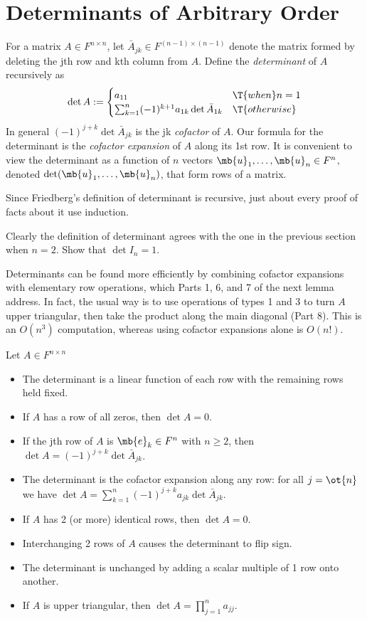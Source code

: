 \section{Determinants of Arbitrary Order}
\begin{defn}%
For a matrix $A \in F^{n \times n}$, let $\bar{A}_{jk}\in F^{(n-1) \times (n-1)}$ denote the matrix formed by deleting the jth row and kth column from $A$. Define the \emph{determinant} of $A$ recursively as 
\[ \det A:= \begin{cases}a_{11}& \T{ when }n=1\\
\sum_{k=1}^n(-1)^{k+1}a_{1k}\det \bar{A}_{1k}& \T{otherwise} \end{cases}\]
In general $(-1)^{j+k}\det \bar{A}_{jk}$ is the jk \emph{cofactor} of $A$. Our formula for the determinant is the \emph{cofactor expansion} of $A$ along its 1st row.
It is convenient to view the determinant as a function of $n$ vectors $\mb{u}_1, \ldots,\mb{u}_n \in F^n$, denoted $\det (\mb{u}_1, \ldots,\mb{u}_n)$, that form rows of a matrix.
\end{defn}
Since Friedberg's definition of determinant is recursive, just about every proof of facts about it use induction.
\begin{example}
Clearly the definition of determinant agrees with the one in the previous section when $n=2$. Show that $\det I_n=1$.
\end{example}
Determinants can be found more efficiently by combining cofactor expansions with elementary row operations, which Parts 1, 6, and 7 of the next lemma address. In fact, the usual way is to use operations of types 1 and 3 to turn $A$ upper triangular, then take the product along the main diagonal (Part 8). This is an $O(n^3)$ computation, whereas using cofactor expansions alone is $O(n!)$.
\begin{lem}\label{l:det-elem}
Let $A \in F^{n \times n}$
\begin{itemize}
\item The determinant is a linear function of each row with the remaining rows held fixed.
\item If $A$ has a row of all zeros, then $\det A=0$.
\item If the jth row of $A$ is $\mb{e}_k \in F^n$ with $n \geq 2$, then $\det A=(-1)^{j+k}\det \bar{A}_{jk}$.
\item The determinant is the cofactor expansion along any row: for all $j=\ot{n}$ we have $\det A= \sum_{k=1}^n(-1)^{j+k}a_{jk}\det \bar{A}_{jk}$.
\item If $A$ has 2 (or more) identical rows, then $\det A=0$.
\item Interchanging 2 rows of $A$ causes the determinant to flip sign.
\item The determinant is unchanged by adding a scalar multiple of 1 row onto another.
\item If $A$ is upper triangular, then $\det A= \prod_{j=1}^na_{jj}$.
\end{itemize}
\end{lem}
